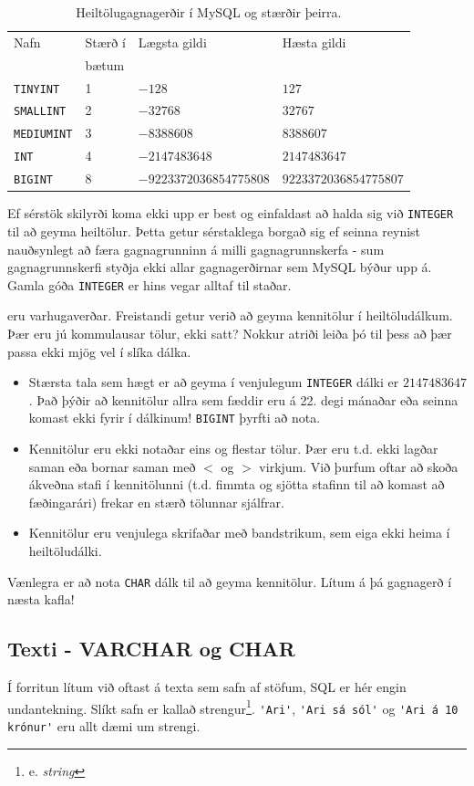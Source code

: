 \begin{table}
\centering
\caption[Heiltöludálkar]{Heiltölugagnagerðir í MySQL og stærðir þeirra.}
\label{tafla:heiltolur}
\begin{tabular}{llll}
\toprule
Nafn&Stærð í&Lægsta gildi&Hæsta gildi\\
&bætum&&\\
\midrule
\verb|TINYINT|&1&$-128$&$127$\\
\verb|SMALLINT|&2&$-32768$&$32767$\\
\verb|MEDIUMINT|&3&$-8388608$&$8388607$\\
\verb|INT|&4&$-2147483648$&$2147483647$\\
\verb|BIGINT|&8&$-9223372036854775808$&$9223372036854775807$\\
\bottomrule
\end{tabular}
\end{table}

Ef sérstök skilyrði koma ekki upp er best og einfaldast að halda sig við \verb|INTEGER| til að geyma heiltölur. Þetta getur sérstaklega borgað sig ef seinna reynist nauðsynlegt að færa gagnagrunninn á milli gagnagrunnskerfa - sum gagnagrunnskerfi styðja ekki allar gagnagerðirnar sem MySQL býður upp á. Gamla góða \verb|INTEGER| er hins vegar alltaf til staðar.

 eru varhugaverðar. Freistandi getur verið að geyma kennitölur í heiltöludálkum. Þær eru jú kommulausar tölur, ekki satt? Nokkur atriði leiða þó til þess að þær passa ekki mjög vel í slíka dálka.

\begin{itemize}
 \item Stærsta tala sem hægt er að geyma í venjulegum \verb|INTEGER| dálki er $2147483647$. Það þýðir að kennitölur allra sem fæddir eru á 22. degi mánaðar eða seinna komast ekki fyrir í dálkinum! \verb|BIGINT| þyrfti að nota.
 \item Kennitölur eru ekki notaðar eins og flestar tölur. Þær eru t.d. ekki lagðar saman eða bornar saman með $<$ og $>$ virkjum. Við þurfum oftar að skoða ákveðna stafi í kennitölunni (t.d. fimmta og sjötta stafinn til að komast að fæðingarári) frekar en stærð tölunnar sjálfrar.
 \item Kennitölur eru venjulega skrifaðar með bandstrikum, sem eiga ekki heima í heiltöludálki.
\end{itemize}
Vænlegra er að nota \verb|CHAR| dálk til að geyma kennitölur. Lítum á þá gagnagerð í næsta kafla!

\subsection{Texti - VARCHAR og CHAR}
Í forritun lítum við oftast á texta sem safn af stöfum, SQL er hér engin undantekning. Slíkt safn er kallað strengur\footnote{e. \emph{string}}. \verb|'Ari'|, \verb|'Ari sá sól'| og \verb|'Ari á 10 krónur'| eru allt dæmi um strengi. 


